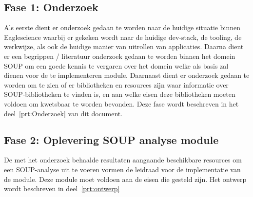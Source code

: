 \subsection{Fase 1: Onderzoek} \label{subsec:fase-1:-onderzoek}
Als eerste dient er onderzoek gedaan te worden naar de huidige situatie binnen Eaglescience waarbij er gekeken wordt naar de huidige dev-stack, de tooling, de werkwijze, als ook de huidige manier van uitrollen van applicaties. Daarna dient er een begrippen / literatuur onderzoek gedaan te worden binnen het domein SOUP om een goede kennis te vergaren over het domein welke als basis zal dienen voor de te implementeren module. Daarnaast dient er onderzoek gedaan te worden om te zien of er bibliotheken en resources zijn waar informatie over SOUP-bibliotheken te vinden is, en aan welke eisen deze bibliotheken moeten voldoen om kwetsbaar te worden bevonden. Deze fase wordt beschreven in het deel~\ref{prt:Onderzoek} van dit document.

\subsection{Fase 2: Oplevering SOUP analyse module}\label{subsec:fase-2:-oplevering-soup-analyse-module}
De met het onderzoek behaalde resultaten aangaande beschikbare resources om een SOUP-analyse uit te voeren vormen de leidraad voor de implementatie van de module. Deze module moet voldoen aan de eisen die gesteld zijn. Het ontwerp wordt beschreven in deel~\ref{prt:ontwerp}
